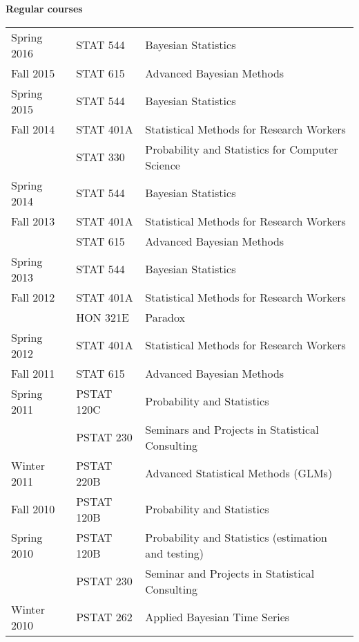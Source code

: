 \documentclass[overlapped,line]{res}
\begin{document}
\begin{resume}
{\bf Regular courses}

\begin{tabular}{lll}
Spring 2016 & STAT 544 & Bayesian Statistics \\
Fall 2015 & STAT 615 & Advanced Bayesian Methods \\
Spring 2015 & STAT 544 & Bayesian Statistics \\
Fall 2014 & STAT 401A & Statistical Methods for Research Workers \\
& STAT 330 & Probability and Statistics for Computer Science \\
Spring 2014 & STAT 544 & Bayesian Statistics \\
Fall 2013 & STAT 401A & Statistical Methods for Research Workers \\
& STAT 615 & Advanced Bayesian Methods \\
Spring 2013 & STAT 544 & Bayesian Statistics \\
Fall 2012 & STAT 401A & Statistical Methods for Research Workers \\
 & HON 321E & Paradox \\
Spring 2012 & STAT 401A & Statistical Methods for Research Workers \\
Fall 2011 & STAT 615 & Advanced Bayesian Methods \\
\hline
Spring 2011 & PSTAT 120C & Probability and Statistics \\ %
& PSTAT 230 & Seminars and Projects in Statistical Consulting \\
Winter 2011 & PSTAT 220B & Advanced Statistical Methods (GLMs) \\
Fall 2010  & PSTAT 120B & Probability and Statistics \\
Spring 2010 & PSTAT 120B & Probability and Statistics (estimation and testing) \\
 & PSTAT 230 & Seminar and Projects in Statistical Consulting \\
Winter 2010 & PSTAT 262 & Applied Bayesian Time Series
\end{tabular}

%




\end{resume}
\end{document}
